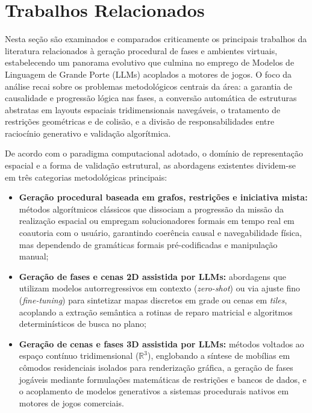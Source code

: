 \section{Trabalhos Relacionados}
\label{sec:trabalhos_relacionados}

Nesta seção são examinados e comparados criticamente os principais trabalhos da literatura relacionados à geração procedural de fases e ambientes virtuais, estabelecendo um panorama evolutivo que culmina no emprego de Modelos de Linguagem de Grande Porte (LLMs) acoplados a motores de jogos. O foco da análise recai sobre os problemas metodológicos centrais da área: a garantia de causalidade e progressão lógica nas fases, a conversão automática de estruturas abstratas em layouts espaciais tridimensionais navegáveis, o tratamento de restrições geométricas e de colisão, e a divisão de responsabilidades entre raciocínio generativo e validação algorítmica.

De acordo com o paradigma computacional adotado, o domínio de representação espacial e a forma de validação estrutural, as abordagens existentes dividem-se em três categorias metodológicas principais:

\begin{itemize}
    \item \textbf{Geração procedural baseada em grafos, restrições e iniciativa mista:} métodos algorítmicos clássicos que dissociam a progressão da missão da realização espacial ou empregam solucionadores formais em tempo real em coautoria com o usuário, garantindo coerência causal e navegabilidade física, mas dependendo de gramáticas formais pré-codificadas e manipulação manual;
    \item \textbf{Geração de fases e cenas 2D assistida por LLMs:} abordagens que utilizam modelos autorregressivos em contexto (\textit{zero-shot}) ou via ajuste fino (\textit{fine-tuning}) para sintetizar mapas discretos em grade ou cenas em \textit{tiles}, acoplando a extração semântica a rotinas de reparo matricial e algoritmos determinísticos de busca no plano;
    \item \textbf{Geração de cenas e fases 3D assistida por LLMs:} métodos voltados ao espaço contínuo tridimensional ($\mathbb{R}^3$), englobando a síntese de mobílias em cômodos residenciais isolados para renderização gráfica, a geração de fases jogáveis mediante formulações matemáticas de restrições e bancos de dados, e o acoplamento de modelos generativos a sistemas procedurais nativos em motores de jogos comerciais.
\end{itemize}

